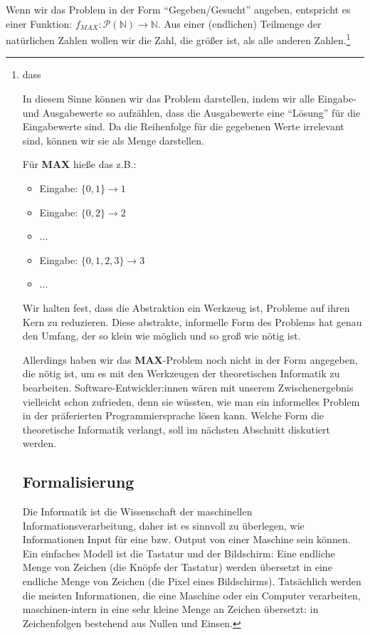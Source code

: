 Wenn wir das Problem in der Form ``Gegeben/Gesucht'' angeben, entspricht es einer Funktion:
$f_{MAX}: \mathcal{P}(\mathbb{N}) \rightarrow \mathbb{N}$.
Aus einer (endlichen) Teilmenge der natürlichen Zahlen wollen wir die Zahl,
die größer ist, als alle anderen Zahlen.\footnote{

dass 








In diesem Sinne können wir das Problem darstellen,
indem wir alle Eingabe- und Ausgabewerte so aufzählen,
dass die Ausgabewerte eine ``Lösung'' für die Eingabewerte sind.
Da die Reihenfolge für die gegebenen Werte irrelevant sind,
können wir sie als Menge darstellen.



Für \textbf{MAX} hieße das z.B.:
\begin{itemize}
    \item Eingabe: $\{0, 1\} \rightarrow 1$
    \item Eingabe: $\{0, 2\} \rightarrow 2$
    \item ... 
    \item Eingabe: $\{0, 1, 2, 3\} \rightarrow 3$
    \item ... 
\end{itemize}
Wir halten fest, dass die Abstraktion ein Werkzeug ist,
Probleme auf ihren Kern zu reduzieren.
Diese abstrakte, informelle Form des Problems hat genau den Umfang,
der so klein wie möglich und so groß wie nötig ist.

Allerdings haben wir das \textbf{MAX}-Problem noch nicht in der Form angegeben,
die nötig ist, um es mit den Werkzeugen der theoretischen Informatik zu bearbeiten.
Software-Entwickler:innen wären mit unserem Zwischenergebnis vielleicht schon zufrieden,
denn sie wüssten, wie man ein informelles Problem
in der präferierten Programmiersprache lösen kann.
Welche Form die theoretische Informatik verlangt, soll im nächsten Abschnitt diskutiert werden.

\section{Formalisierung}

Die Informatik ist die Wissenschaft der maschinellen Informationsverarbeitung,
daher ist es sinnvoll zu überlegen,
wie Informationen Input für eine bzw. Output von einer Maschine sein können.
Ein einfaches Modell ist die Tastatur und der Bildschirm:
Eine endliche Menge von Zeichen (die Knöpfe der Tastatur) werden übersetzt in eine
endliche Menge von Zeichen (die Pixel eines Bildschirms).
Tatsächlich werden die meisten Informationen,
die eine Maschine oder ein Computer verarbeiten,
maschinen-intern in eine sehr kleine Menge an Zeichen übersetzt:
in Zeichenfolgen bestehend aus Nullen und Einsen.

}

